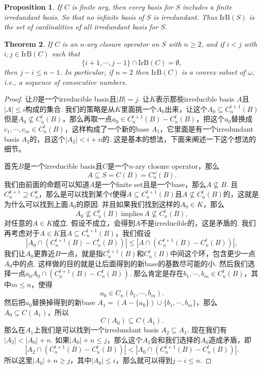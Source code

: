\documentclass{article}
\newtheorem{theorem}{Theorem}[section]
\newtheorem{proposition}[theorem]{Proposition}
\begin{document}
\begin{proposition}
\rm If $C$ is finite ary, then every basis for $S$ includes a finite irredundant basis. So that no infinite basis of $S$ is irredundant. Thus $\text{IrB}(S)$ is the set of cardinalities of all irredundant basis for $S$.
\end{proposition}


\begin{theorem}
\rm If $C$ is an $n$-ary closure operator on $S$ with $n \geq 2$, and if $i < j$ with $i, j \in \text{IrB}(C)$ such that 
$$
\{i+1,\cdots,j-1\} \cap \text{IrB}(C) = \emptyset,
$$
then $j-i \leq n-1$. In particular, if $n=2$ then $\text{IrB}(C)$ is a convex subset of $\omega$, i.e., a sequence of consecutive numbers. 
\end{theorem}

\begin{proof}
让$B$是一个irreducible basis且$|B| = j$. 让$K$表示那些irreducible basis $A$且$|A| \leq i$构成的集合. 我们的策略是从$K$里面挑一个$A_0$出来，让这个$A_0 \subseteq C_n^{t+1}(B)$但是$A_0 \nsubseteq C_n^{t}(B)$，那么再取一点$a_0 \in C_n^{t+1}(B) - C_n^{t}(B)$，把这个$a_0$替换成$c_1,\cdots,c_m \in C_n^{t}(B)$，这样构成了一个新的base $A_1$，它里面是有一个irredundant basis $A_2$的，且这个$|A_2| < i+n$的. 这是基本的想法，下面来阐述一下这个想法的细节。

首先$B$是一个irreducible basis且$C$是一个$n$-ary closure operator，那么
$$
A \subseteq S = C(B) = C_n^{\omega}(B).
$$
我们由前面的命题可以知道$A$是一个finite set且是一个base，那么$A \nsubseteq B$. 且$C_n^{k+1} \supseteq C_n^{k}$，那么是可以找到某个$t$使得$A \subseteq C_n^{t+1}(B)$且$A \nsubseteq C_n^{t}(B)$的，这就是为什么可以找到上面$A_0$的原因. 并且如果我们找到这样的$A_0 \in K$，那么
$$
A_0 \nsubseteq C_n^t(B)\ \text{implies} \ A \nsubseteq C_n^{t}(B),
$$
对任意的$A \in K$成立. 假设不成立，会得到$A$不是irreducible的，这是矛盾的. 我们再考虑对于$A \in K$且$A\subseteq C_n^{t+1}(B)$，我们假设
$$
|A_0 \cap (C_n^{t+1}(B) - C_n^{t}(B))| \leq |A \cap (C_n^{t+1}(B) - C_n^{t}(B))|,
$$
我们让$A_0$更靠近$B$一点，就是指$C_n^{t+1}(B)$和$C_n^t(B)$中间这个环，包含更少一点$A_0$中的点. 这样做的目的就是让后面得到的新base的基数尽可能的小. 然后我们选择一点$a_0 A_0 \cap (C_n^{t+1}(B) - C_n^{t}(B))$. 那么肯定是存在$b_1,\cdots,b_m \in C_n^t(B)$，其中$m \leq n$，使得
$$
a_0 \in C_n({b_1,\cdots,b_m}).
$$
然后把$a_0$替换掉得到的新base $A_1 = (A - \{a_0\}) \cup \{b_1,\cdots,b_m\}$，那么$A_0 \subseteq C(A_1)$，所以
$$
C(A_0) \subseteq C(A_1).
$$
那么在$A_1$上我们是可以找到一个irredundant basis $A_2 \subseteq A_1$. 现在我们有$|A_2| < |A_0| + n$. 如果$|A_0| + n \leq j$，那么这个$A_2$会和我们选择的$A_0$造成矛盾，即
$$
|A_2 \cap (C_n^{t+1}(B) - C_n^{t}(B))| < |A_0 \cap (C_n^{t+1}(B) - C_n^{t}(B))|.
$$
所以这里$|A_0| + n \geq j$，其中$|A_0| \leq i$，那么就可以得到$j - i \leq n$.


\end{proof}
\end{document}

